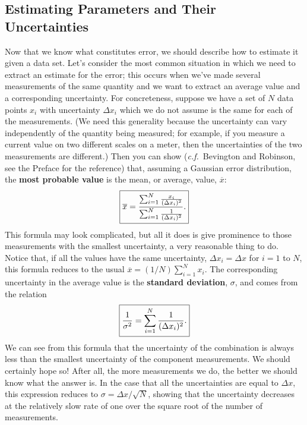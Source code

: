 \subsection{Estimating Parameters and Their Uncertainties}
\label{sec:intro:uncert}
Now that we know what constitutes error, we should describe how to estimate 
it given a data set. Let's consider the most common situation in which we 
need to extract an estimate for the error; this occurs when we've made several
measurements of the same quantity and we want to extract an average value and 
a corresponding uncertainty. For concreteness, suppose we have a set of $N$ 
data points $x_i$ with uncertainty $\Delta x_i$ which we do not assume is the 
same for each of the measurements. (We need this generality because the 
uncertainty can vary independently of  the quantity being measured; for 
example, if you measure a current value on two different scales on a meter, 
then the uncertainties of the two measurements are different.) Then you can 
show ({\it c.f.}~Bevington and Robinson, see the Preface for the reference) 
that, assuming a Gaussian error distribution, the {\bf most probable value} is the 
mean, or average, value, $\overline{x}$:
\begin{equation}
\fbox{$ \displaystyle \overline{x} = \frac{\sum^{N}_{i=1} \frac{x_i}{(\Delta x_i)^2}}
{ \sum^{N}_{i=1} \frac{1}{(\Delta x_i)^2}}. $}   \label{eq:intro:average}
\end{equation}
This formula may look complicated, but all it does is give prominence to those 
measurements with the smallest uncertainty, a very reasonable thing to do. 
Notice that, if all the values have the same uncertainty, $\Delta x_i = \Delta 
x$ for $i=1$ to $N$, this formula reduces to the usual $\overline{x} = (1/N) 
\sum^{N}_{i=1} x_i$.   The corresponding uncertainty in the average value is 
the {\bf standard deviation}, $\sigma$, and comes from  the relation
\begin{equation}
\fbox{$ \displaystyle \frac{1}{\sigma^2} = \sum_{i=1}^{N} \frac{1}{(\Delta x_i)^2}. $}
\label{eq:intro:standdev}
\end{equation}
We can see from this formula that the uncertainty of  the combination is 
always less than the smallest uncertainty of the component measurements. We 
should certainly hope so! After all, the more measurements we do, the better 
we should know what the answer is. In the case that all the uncertainties are 
equal to $\Delta x$, this expression reduces to $\sigma = \Delta x / 
\sqrt{N}$, showing that the uncertainty decreases at the relatively slow rate 
of one over the square root of the number of measurements.

